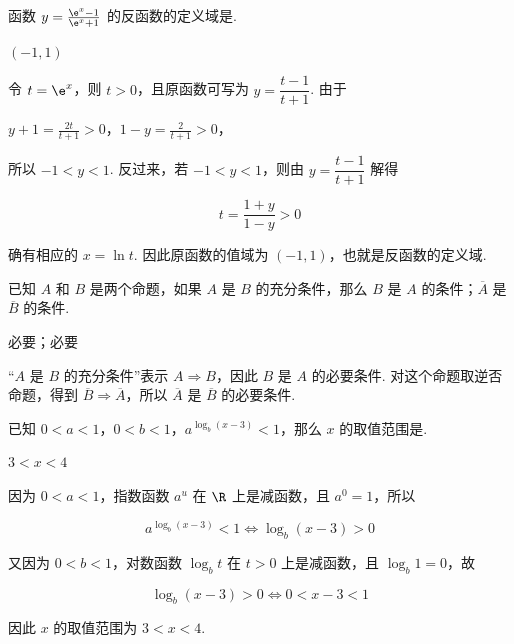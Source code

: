 \documentclass[UTF8,a4paper,oneside,11pt]{ctexbook}
\begin{document}
\begin{problem}
函数 \(y = \frac{\e^x - 1}{\e^x + 1}\) 的反函数的定义域是\fillinblank{}.
\end{problem}

\begin{answer}
\(\left(-1,1\right)\)
\end{answer}

\begin{solution}
令 \(t=\e^x\)，则 \(t>0\)，且原函数可写为 \(y=\dfrac{t-1}{t+1}\). 由于

\(y+1=\frac{2t}{t+1}>0\)，\(1-y=\frac{2}{t+1}>0\)，

所以 \(-1<y<1\). 反过来，若 \(-1<y<1\)，则由 \(y=\dfrac{t-1}{t+1}\) 解得

\[t=\frac{1+y}{1-y}>0\]

确有相应的 \(x=\ln t\). 因此原函数的值域为 \(\left(-1,1\right)\)，也就是反函数的定义域.
\end{solution}

\begin{problem}
已知 \(A\) 和 \(B\) 是两个命题，如果 \(A\) 是 \(B\) 的充分条件，那么 \(B\) 是 \(A\) 的\fillinblank{}条件；\(\overline{A}\) 是 \(\overline{B}\) 的\fillinblank{}条件.
\end{problem}

\begin{answer}
必要；必要
\end{answer}

\begin{solution}
“\(A\) 是 \(B\) 的充分条件”表示 \(A\Rightarrow B\)，因此 \(B\) 是 \(A\) 的必要条件. 对这个命题取逆否命题，得到 \(\overline{B}\Rightarrow\overline{A}\)，所以 \(\overline{A}\) 是 \(\overline{B}\) 的必要条件.
\end{solution}

\begin{problem}
已知 \(0 < a < 1\)，\(0 < b < 1\)，\(a^{\log_b(x - 3)} < 1\)，那么 \(x\) 的取值范围是\fillinblank{}.
\end{problem}

\begin{answer}
\(3<x<4\)
\end{answer}

\begin{solution}
因为 \(0<a<1\)，指数函数 \(a^u\) 在 \(\R\) 上是减函数，且 \(a^0=1\)，所以

\[a^{\log_b(x-3)}<1\Longleftrightarrow \log_b(x-3)>0\]

又因为 \(0<b<1\)，对数函数 \(\log_b t\) 在 \(t>0\) 上是减函数，且 \(\log_b1=0\)，故

\[\log_b(x-3)>0\Longleftrightarrow 0<x-3<1\]

因此 \(x\) 的取值范围为 \(3<x<4\).
\end{solution}
\end{document}
